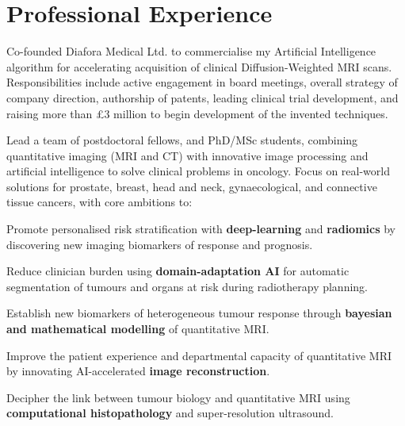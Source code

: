 \documentclass[]{mbcv}
\begin{document}
\begin{minipage}[t]{0.65\textwidth}

\section{Professional Experience}
Co-founded Diafora Medical Ltd. to commercialise my Artificial Intelligence algorithm for accelerating acquisition of clinical Diffusion-Weighted MRI scans. Responsibilities include active engagement in board meetings, overall strategy of company direction, authorship of patents, leading clinical trial development, and raising more than £3 million to begin development of the invented techniques.

\vspace{10pt}

Lead a team of postdoctoral fellows, and PhD/MSc students, combining quantitative imaging (MRI and CT) with innovative image processing and artificial intelligence to solve clinical problems in oncology. Focus on real-world solutions for prostate, breast, head and neck, gynaecological, and connective tissue cancers, with core ambitions to:
 
\vspace*{20pt}
\begin{tightemize}
\item Promote personalised risk stratification with \textbf{deep-learning} and \textbf{radiomics} by discovering new imaging biomarkers of response and prognosis.
\item Reduce clinician burden using \textbf{domain-adaptation AI} for automatic segmentation of tumours and organs at risk during radiotherapy planning.
\item Establish new biomarkers of heterogeneous tumour response through \textbf{bayesian and mathematical modelling} of quantitative MRI.
\item Improve the patient experience and departmental capacity of quantitative MRI by innovating AI-accelerated \textbf{image reconstruction}.
\item Decipher the link between tumour biology and quantitative MRI using \textbf{computational histopathology} and super-resolution ultrasound.
\end{tightemize}

\sectionsep


\end{minipage}
\end{document}
